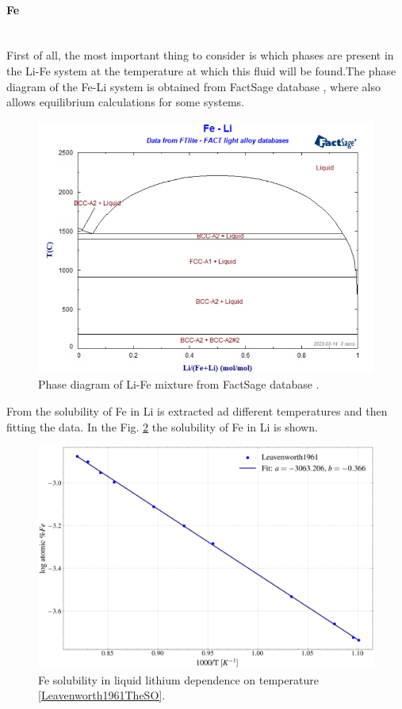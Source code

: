 \paragraph{Fe}~\\
\vspace{1mm} %
First of all, the most important thing to consider is which phases are present in the Li-Fe system at the temperature at 
which this fluid will be found.The phase diagram of the Fe-Li system is obtained from FactSage database \cite{Bale2016}, where also allows 
equilibrium calculations for some systems.
\begin{figure}[H]
    \centering
    \includegraphics[width=0.9\linewidth]{Fe-Li_phase_diagram.png}
    \caption{Phase diagram of Li-Fe mixture from FactSage database \cite{Bale2016}.}
    \label{fig:fe_li_diagram}
\end{figure}

From \cite{Leavenworth1961TheSO} the solubility of Fe in Li is extracted ad different temperatures and then fitting the data. In the Fig. \ref{fig:Fe_solubility} the solubility of Fe in Li is shown.
\begin{figure}[H]
    \centering
    \includegraphics[width=0.9\linewidth]{Fe_solubility.png}
    \caption{Fe solubility in liquid lithium dependence on temperature \ref{Leavenworth1961TheSO}. }
    \label{fig:Fe_solubility}
\end{figure}

